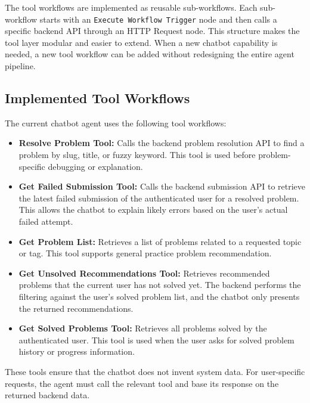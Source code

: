The tool workflows are implemented as reusable sub-workflows. Each sub-workflow starts with an \texttt{Execute Workflow Trigger} node and then calls a specific backend API through an HTTP Request node. This structure makes the tool layer modular and easier to extend. When a new chatbot capability is needed, a new tool workflow can be added without redesigning the entire agent pipeline.

\subsection{Implemented Tool Workflows}

The current chatbot agent uses the following tool workflows:

\begin{itemize}
    \item \textbf{Resolve Problem Tool:} Calls the backend problem resolution API to find a problem by slug, title, or fuzzy keyword. This tool is used before problem-specific debugging or explanation.
    
    \item \textbf{Get Failed Submission Tool:} Calls the backend submission API to retrieve the latest failed submission of the authenticated user for a resolved problem. This allows the chatbot to explain likely errors based on the user's actual failed attempt.
    
    \item \textbf{Get Problem List:} Retrieves a list of problems related to a requested topic or tag. This tool supports general practice problem recommendation.
    
    \item \textbf{Get Unsolved Recommendations Tool:} Retrieves recommended problems that the current user has not solved yet. The backend performs the filtering against the user's solved problem list, and the chatbot only presents the returned recommendations.
    
    \item \textbf{Get Solved Problems Tool:} Retrieves all problems solved by the authenticated user. This tool is used when the user asks for solved problem history or progress information.
\end{itemize}

These tools ensure that the chatbot does not invent system data. For user-specific requests, the agent must call the relevant tool and base its response on the returned backend data.

